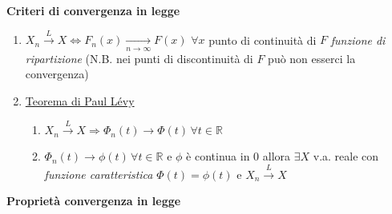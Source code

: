 \documentclass[openany]{book} %
\begin{document}
\textbf{Criteri di convergenza in legge}

\begin{enumerate}

\item $X_n \overset{L}{\rightarrow}X \Leftrightarrow F_n(x)\underset{n \rightarrow\infty}{\rightarrow}F(x)$ $\forall x$ punto di continuità di $F$ \textit{funzione di ripartizione} (N.B. nei punti di discontinuità di $F$ può non esserci la convergenza)

\item \underline{Teorema di Paul Lévy} 

\begin{enumerate}

\item $X_n \overset{L}{\rightarrow}X \Rightarrow \Phi_n(t)\rightarrow\Phi(t)\,\forall t\in \mathbb{R}$

\item $\Phi_n(t)\rightarrow\phi(t)\,\forall t\in \mathbb{R}$ e $\phi$ è continua in 0 allora $\exists X$ v.a. reale con \textit{funzione caratteristica} $\Phi(t)=\phi(t)$ e $X_n \overset{L}{\rightarrow}X$

\end{enumerate}

\end{enumerate}

\textbf{Proprietà convergenza in legge}
\end{document}
